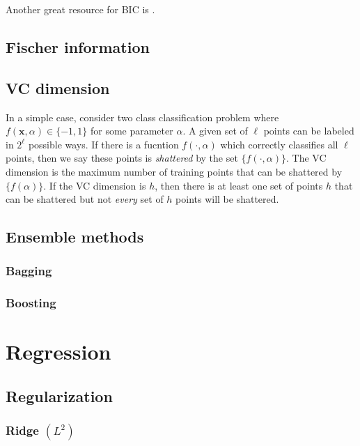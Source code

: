 \documentclass[12pt]{article}
\begin{document}
Another great resource for BIC is \cite{Raftery}.

\subsection{Fischer information}


\subsection{VC dimension}

In a simple case, consider two class classification problem where $f(\mathbf
x,\alpha) \in \{-1,1\}$ for some parameter $\alpha$. A given set of $\ell$
points can be labeled in $2^\ell$ possible ways. If there is a fucntion
$f(\cdot,\alpha)$ which correctly classifies all $\ell$ points, then we say
these points is {\sl shattered} by the set $\{f(\cdot,\alpha)\}$. The VC
dimension is the maximum number of training points that can be shattered by
$\{f(\alpha)\}$. If the VC dimension is $h$, then there is at least one set of
points $h$ that can be shattered but not {\sl every} set of $h$ points will be
shattered.  \cite[\S2.1]{Burges2004}



\subsection{Ensemble methods}

\subsubsection{Bagging}

\subsubsection{Boosting}


\printbibliography[heading=subbibnumbered]
\pagebreak

\section{Regression}

\subsection{Regularization}
\subsubsection{Ridge $(L^2)$}
\end{document}
